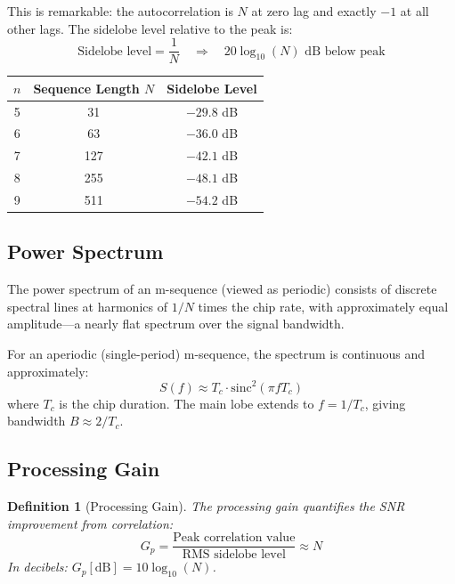 \documentclass[11pt]{article}
\newtheorem{definition}{Definition}
\begin{document}
This is remarkable: the autocorrelation is $N$ at zero lag and exactly $-1$ at all other lags. The sidelobe level relative to the peak is:
\begin{equation}
\text{Sidelobe level} = \frac{1}{N} \quad \Rightarrow \quad 20\log_{10}(N) \text{ dB below peak}
\end{equation}

\begin{center}
\begin{tabular}{ccc}
\toprule
$n$ & Sequence Length $N$ & Sidelobe Level \\
\midrule
5 & 31 & $-29.8$ dB \\
6 & 63 & $-36.0$ dB \\
7 & 127 & $-42.1$ dB \\
8 & 255 & $-48.1$ dB \\
9 & 511 & $-54.2$ dB \\
\bottomrule
\end{tabular}
\end{center}

\subsection{Power Spectrum}

The power spectrum of an m-sequence (viewed as periodic) consists of discrete spectral lines at harmonics of $1/N$ times the chip rate, with approximately equal amplitude---a nearly flat spectrum over the signal bandwidth.

For an aperiodic (single-period) m-sequence, the spectrum is continuous and approximately:
\begin{equation}
S(f) \approx T_c \cdot \text{sinc}^2(\pi f T_c)
\end{equation}
where $T_c$ is the chip duration. The main lobe extends to $f = 1/T_c$, giving bandwidth $B \approx 2/T_c$.

\subsection{Processing Gain}

\begin{definition}[Processing Gain]
The processing gain quantifies the SNR improvement from correlation:
\begin{equation}
G_p = \frac{\text{Peak correlation value}}{\text{RMS sidelobe level}} \approx N
\end{equation}
In decibels: $G_p[\text{dB}] = 10\log_{10}(N)$.
\end{definition}
\end{document}

